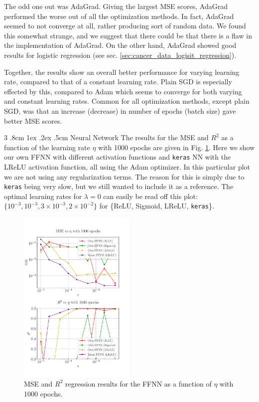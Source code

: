 \documentclass[%
reprint,s
amsmath,amssymb,
aps,
]{revtex4-2}
\makeatletter
\renewcommand{\subsubsection}{%
	\@startsection
	{subsubsection}%
	{3}%
	{\z@}%
	{.8cm \@plus1ex \@minus .2ex}%
	{.5cm}%
	{\normalfont\small\centering}%
}
\makeatother
\begin{document}
The odd one out was AdaGrad. Giving the largest MSE scores, AdaGrad performed the worse out of all the optimization methods. In fact, AdaGrad seemed to not converge at all, rather producing sort of random data. We found this somewhat strange, and we suggest that there could be that there is a flaw in the implementation of AdaGrad. On the other hand, AdaGrad showed good results for logistic regression (see sec. \ref{sec:cancer_data_logisit_regression}).

Together, the results show an overall better performance for varying learning rate, compared to that of a constant learning rate. Plain SGD is especially effected by this, compared to Adam which seems to converge for both varying and constant learning rates. Common for all optimization methods, except plain SGD, was that an increase (decrease) in number of epochs (batch size) gave better MSE scores.

\subsubsection{Neural Network}
The results for the MSE and $R^2$ as a function of the learning rate $\eta$ with 1000 epochs are given in Fig. \ref{fig:NN_Franke_LR_1000}. Here we show our own FFNN with different activation functions and \texttt{keras} NN with the LReLU activation function, all using the Adam optimizer. In this particular plot we are not using any regularization terms. The reason for this is simply due to \texttt{keras} being very slow, but we still wanted to include it as a reference. The optimal learning rates for $\lambda=0$ can easily be read off this plot: $\{10^{-3},10^{-3},3\times10^{-3},2\times 10^{-2}\}$ for \{ReLU, Sigmoid, LReLU, \texttt{keras}\}.
\begin{figure}[ht!]
	\includegraphics[width=0.5\textwidth]{Figures/NN_MSE_R2_Franke_LearningRate_Epochs1000.pdf}
	\caption{MSE and $R^2$ regression results for the FFNN as a function of $\eta$ with 1000 epochs.}
	\label{fig:NN_Franke_LR_1000}
\end{figure}
\end{document}
